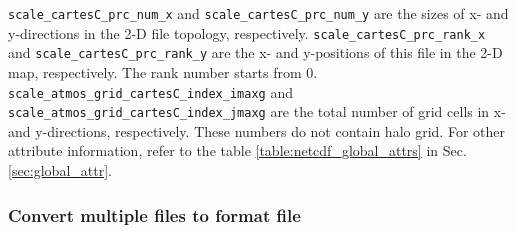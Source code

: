 
\verb|scale_cartesC_prc_num_x| and \verb|scale_cartesC_prc_num_y|
are the sizes of x- and y-directions in the 2-D file topology, respectively.
\verb|scale_cartesC_prc_rank_x| and \verb|scale_cartesC_prc_rank_y|
are the x- and y-positions of this file in the 2-D map, respectively.
The rank number starts from 0.
\verb|scale_atmos_grid_cartesC_index_imaxg| and \verb|scale_atmos_grid_cartesC_index_jmaxg|
are the total number of grid cells in x- and y-directions, respectively.
These numbers do not contain halo grid.
For other attribute information, refer to the table \ref{table:netcdf_global_attrs} in Sec. \ref{sec:global_attr}.




\subsubsection{Convert multiple \scalenetcdf files to \grads format file}
%

